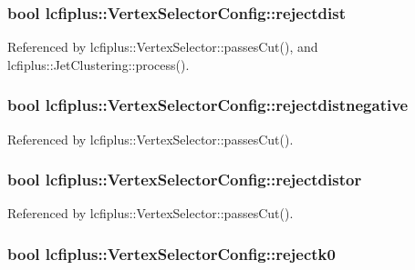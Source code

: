 \subsubsection[{rejectdist}]{\setlength{\rightskip}{0pt plus 5cm}bool lcfiplus\-::\-Vertex\-Selector\-Config\-::rejectdist}\label{classlcfiplus_1_1VertexSelectorConfig_a7aba5b2a0aaf1be09634dc0334bf265b}


Referenced by lcfiplus\-::\-Vertex\-Selector\-::passes\-Cut(), and lcfiplus\-::\-Jet\-Clustering\-::process().

\subsubsection[{rejectdistnegative}]{\setlength{\rightskip}{0pt plus 5cm}bool lcfiplus\-::\-Vertex\-Selector\-Config\-::rejectdistnegative}\label{classlcfiplus_1_1VertexSelectorConfig_a0733f8036fcd712a3e1a80f192e23216}


Referenced by lcfiplus\-::\-Vertex\-Selector\-::passes\-Cut().

\subsubsection[{rejectdistor}]{\setlength{\rightskip}{0pt plus 5cm}bool lcfiplus\-::\-Vertex\-Selector\-Config\-::rejectdistor}\label{classlcfiplus_1_1VertexSelectorConfig_aac4397be4f2292ee8c8d8d36cc48336c}


Referenced by lcfiplus\-::\-Vertex\-Selector\-::passes\-Cut().

\subsubsection[{rejectk0}]{\setlength{\rightskip}{0pt plus 5cm}bool lcfiplus\-::\-Vertex\-Selector\-Config\-::rejectk0}\label{classlcfiplus_1_1VertexSelectorConfig_abc82afe3048e95721fe135f4c575897b}



